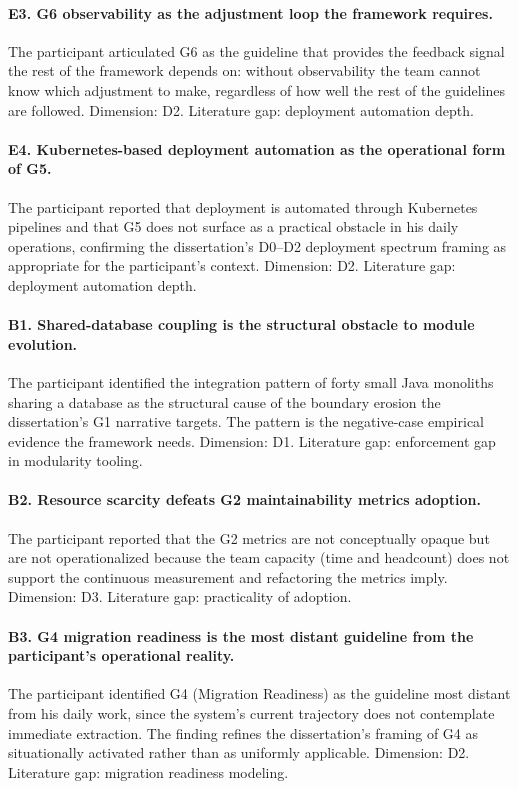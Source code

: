 \paragraph*{E3. G6 observability as the adjustment loop the framework requires.} The participant articulated G6 as the guideline that provides the feedback signal the rest of the framework depends on: without observability the team cannot know which adjustment to make, regardless of how well the rest of the guidelines are followed. Dimension: D2. Literature gap: deployment automation depth.

\paragraph*{E4. Kubernetes-based deployment automation as the operational form of G5.} The participant reported that deployment is automated through Kubernetes pipelines and that G5 does not surface as a practical obstacle in his daily operations, confirming the dissertation's D0--D2 deployment spectrum framing as appropriate for the participant's context. Dimension: D2. Literature gap: deployment automation depth.

\paragraph*{B1. Shared-database coupling is the structural obstacle to module evolution.} The participant identified the integration pattern of forty small Java monoliths sharing a database as the structural cause of the boundary erosion the dissertation's G1 narrative targets. The pattern is the negative-case empirical evidence the framework needs. Dimension: D1. Literature gap: enforcement gap in modularity tooling.

\paragraph*{B2. Resource scarcity defeats G2 maintainability metrics adoption.} The participant reported that the G2 metrics are not conceptually opaque but are not operationalized because the team capacity (time and headcount) does not support the continuous measurement and refactoring the metrics imply. Dimension: D3. Literature gap: practicality of adoption.

\paragraph*{B3. G4 migration readiness is the most distant guideline from the participant's operational reality.} The participant identified G4 (Migration Readiness) as the guideline most distant from his daily work, since the system's current trajectory does not contemplate immediate extraction. The finding refines the dissertation's framing of G4 as situationally activated rather than as uniformly applicable. Dimension: D2. Literature gap: migration readiness modeling.

